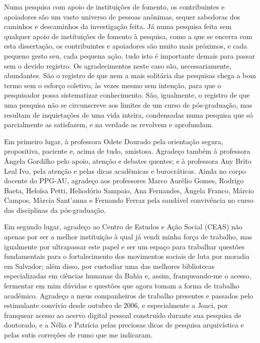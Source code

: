 \begin{agradecimentos}
Numa pesquisa com apoio de instituições de fomento, os contribuintes e apoiadores são um vasto universo de pessoas anônimas, sequer sabedoras dos caminhos e descaminhos da investigação feita. Já numa pesquisa feita sem qualquer apoio de instituições de fomento à pesquisa, como a que se encerra com esta dissertação, os contribuintes e apoiadores são muito mais próximos, e cada pequeno gesto seu, cada pequena ação, tudo isto é importante demais para passar sem o devido registro. Os agradecimentos neste caso são, necessariamente, abundantes. São o registro de que nem a mais solitária das pesquisas chega a bom termo sem o esforço coletivo, às vezes mesmo sem intenção, para que o pesquisador possa sistematizar conhecimento. São, igualmente, o registro de que uma pesquisa não se circunscreve aos limites de um curso de pós-graduação, mas resultam de inquietações de uma vida inteira, condensadas numa pesquisa que só parcialmente as satisfazem, e na verdade as revolvem e aprofundam.

Em primeiro lugar, à professora Odete Dourado pela orientação segura, propositiva, paciente e, acima de tudo, amistosa. Agradeço também à professora Ângela Gordilho pelo apoio, atenção e debates quentes; e à professora Any Brito Leal Ivo, pela atenção e pelas dicas acadêmicas e burocráticas. Ainda no corpo docente do PPG-AU, agradeço aos professores Marco Aurélio Gomes, Rodrigo Baeta, Heloísa Petti, Heliodório Sampaio, Ana Fernandes, Ângela Franco, Márcio Campos, Màrcia Sant'anna e Fernando Ferraz pela saudável convivência no curso das disciplinas da pós-graduação.

Em segundo lugar, agradeço ao Centro de Estudos e Ação Social (CEAS) não apenas por ser a melhor instituição à qual já vendi minha força de trabalho, mas igualmente por ultrapassar este papel e ser um espaço para trabalhar questões fundamentais para o fortalecimento dos movimentos sociais de luta por moradia em Salvador; além disso, por custodiar uma das melhores bibliotecas especializadas em ciências humanas da Bahia e, assim, franqueando-me o acesso, fermentar em mim dúvidas e questões que agora tomam a forma de trabalho acadêmico. Agradeço a meus companheiros de trabalho presentes e passados pelo estimulante convívio desde outubro de 2006, e especialmente a Joaci, por franquear acesso ao acervo digital pessoal construído durante sua pesquisa de doutorado, e a Nélia e Patrícia pelas preciosas dicas de pesquisa arquivística e pelas sutis correções de rumo que me indicaram.


\end{agradecimentos}
